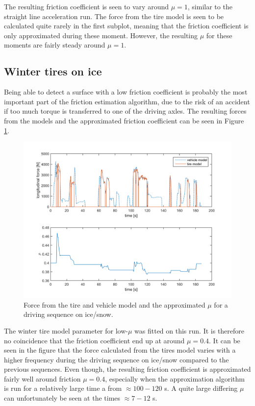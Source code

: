 The resulting friction coefficient is seen to vary around $ \mu = 1 $, similar to the straight line acceleration run. The force from the tire model is seen to be calculated quite rarely in the first subplot, meaning that the friction coefficient is only approximated during these moment. However, the resulting $ \mu $ for these moments are fairly steady around $ \mu = 1 $. 

\subsection{Winter tires on ice}
Being able to detect a surface with a low friction coefficient is probably the most important part of the friction estimation algorithm, due to the risk of an accident if too much torque is transferred to one of the driving axles. The resulting forces from the models and the approximated friction coefficient can be seen in Figure \ref{force_mue_ice_normal}.

\begin{figure}[h]
	\centering
	\includegraphics[width=1.0\textwidth]{Pictures/force_mue_ice_normal}
	\caption {Force from the tire and vehicle model and the approximated $ \mu $ for a driving sequence on ice/snow.}
	\label{force_mue_ice_normal}
\end{figure}

The winter tire model parameter for low-$ \mu $ was fitted on this run. It is therefore no coincidence that the friction coefficient end up at around $ \mu = 0.4 $. It can be seen in the figure that the force calculated from the tires model varies with a higher frequency during the driving sequence on ice/snow compared to the previous sequences. Even though, the resulting friction coefficient is approximated fairly well around friction $ \mu = 0.4 $, especially when the approximation algorithm is run for a relatively large time a from $ \approx 100-120 $ s. A quite large differing $ \mu $ can unfortunately be seen at the times $ \approx 7  - 12$ s.

